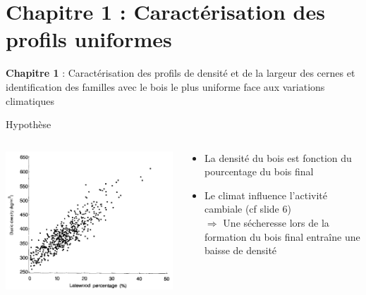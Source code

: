 \documentclass{beamer}
\begin{document}
\section{Chapitre 1 : Caractérisation des profils uniformes}
\begin{frame}%
\Large	\textbf{Chapitre 1} : Caractérisation des profils de densité et de la largeur des cernes et identification des familles avec le bois le plus uniforme face aux variations climatiques\\
	
\end{frame}
\begin{frame}{Hypothèse}
	\begin{columns}
		
		\begin{column}{0.45\textwidth}
			\includegraphics[width=\textwidth]{densityvsladewoodLindstrom1996}\\
		\end{column}
		
		\begin{column}{0.52\textwidth}
			\begin{itemize} 
				\item La densité du bois est fonction du pourcentage du bois final\\
				\vspace{0.5cm}
				\item Le climat influence l'activité cambiale (cf slide 6)\\
				\vspace{1cm} 
				$\Rightarrow$ Une sécheresse lors de la formation du bois final entraîne une baisse de densité
			\end{itemize}		
		\end{column}
		

\end{columns}
\end{frame}
\end{document}
